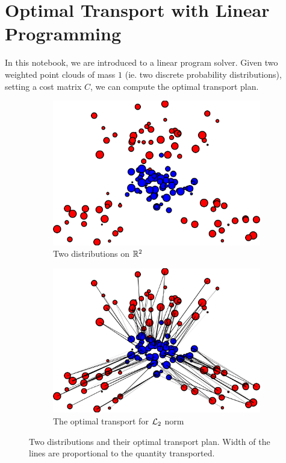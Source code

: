 \section{Optimal Transport with Linear Programming}

In this notebook, we are introduced to a linear program solver. Given two weighted point clouds of mass $1$ (ie. two discrete probability distributions), setting a cost matrix $C$, we can compute the optimal transport plan. 

\begin{figure}[h]
     \centering
     \begin{subfigure}[b]{0.49\textwidth}
         \centering
         \includegraphics[width=\textwidth]{samples/1/point_cloud.png}
         \caption{Two distributions on $\mathbb{R}^2$}
     \end{subfigure}
     \hfill
     \begin{subfigure}[b]{0.49\textwidth}
         \centering
         \includegraphics[width=\textwidth]{samples/1/point_cloud_OT.png}
         \caption{The optimal transport for $\mathcal{L}_2$ norm}
     \end{subfigure}
    \caption{Two distributions and their optimal transport plan. Width of the lines are proportional to the quantity transported.}
\end{figure}

